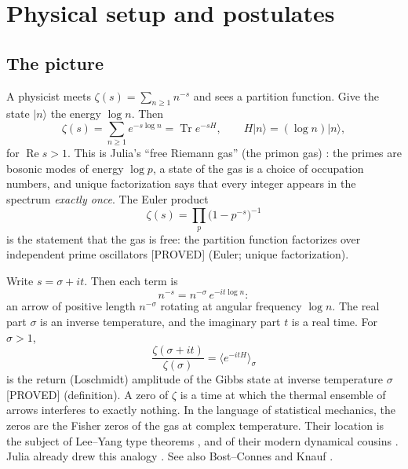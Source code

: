 \documentclass[11pt,a4paper]{article}
\theoremstyle{plain}
\theoremstyle{definition}
\theoremstyle{remark}
\newcommand{\lab}[1]{\textsf{\small[#1]}}
\newcommand{\PROVED}{\lab{PROVED}}
\renewcommand{\Re}{\operatorname{Re}}
\begin{document}
\section{Physical setup and postulates}
\label{sec:setup}

\subsection{The picture}

A physicist meets $\zeta(s)=\sum_{n\ge1}n^{-s}$ and sees a partition
function. Give the state $|n\rangle$ the energy $\log n$. Then
\begin{equation}\label{eq:primon}
\zeta(s)=\sum_{n\ge1}e^{-s\log n}=\operatorname{Tr}e^{-sH},
\qquad H|n\rangle=(\log n)|n\rangle ,
\end{equation}
for $\Re s>1$. This is Julia's ``free Riemann gas'' (the primon gas)
\cite{Julia1990,Spector1990}: the primes are bosonic modes of energy
$\log p$, a state of the gas is a choice of occupation numbers, and unique
factorization says that every integer appears in the spectrum
\emph{exactly once}. The Euler product
\begin{equation}\label{eq:euler}
\zeta(s)=\prod_p\bigl(1-p^{-s}\bigr)^{-1}
\end{equation}
is the statement that the gas is free: the partition function factorizes
over independent prime oscillators \PROVED{} (Euler; unique factorization).

Write $s=\sigma+it$. Then each term is
\begin{equation}\label{eq:arrow}
n^{-s}=n^{-\sigma}\,e^{-it\log n}:
\end{equation}
an arrow of positive length $n^{-\sigma}$ rotating at angular frequency
$\log n$. The real part $\sigma$ is an inverse temperature, and the imaginary
part $t$ is a real time. For $\sigma>1$,
\[
\frac{\zeta(\sigma+it)}{\zeta(\sigma)}=\bigl\langle e^{-itH}\bigr\rangle_{\sigma}
\]
is the return (Loschmidt) amplitude of the Gibbs state at inverse
temperature $\sigma$ \PROVED{} (definition). A zero of $\zeta$ is a time at
which the thermal ensemble of arrows interferes to exactly nothing. In the
language of statistical mechanics, the zeros are the Fisher zeros of the gas
at complex temperature. Their location is the subject of Lee--Yang type
theorems \cite{LeeYang1952}, and of their modern dynamical cousins
\cite{Heyl2013}. Julia already drew this analogy \cite{Julia1990}. See also
Bost--Connes \cite{BostConnes1995} and Knauf \cite{Knauf1999}.
\end{document}
